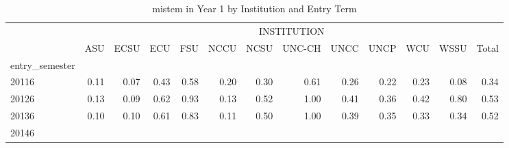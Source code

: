 \begin{table}[!h]
\caption{mistem in Year 1 by Institution and Entry Term}
\centering
\begin{tabular}{lllllllllllll}
\cline{1-13}
\multicolumn{1}{c}{} &
  \multicolumn{12}{|c}{INSTITUTION} \\
\multicolumn{1}{c}{} &
  \multicolumn{1}{|r}{ASU} &
  \multicolumn{1}{r}{ECSU} &
  \multicolumn{1}{r}{ECU} &
  \multicolumn{1}{r}{FSU} &
  \multicolumn{1}{r}{NCCU} &
  \multicolumn{1}{r}{NCSU} &
  \multicolumn{1}{r}{UNC-CH} &
  \multicolumn{1}{r}{UNCC} &
  \multicolumn{1}{r}{UNCP} &
  \multicolumn{1}{r}{WCU} &
  \multicolumn{1}{r}{WSSU} &
  \multicolumn{1}{r}{Total} \\
\cline{1-13}
\multicolumn{1}{l}{entry\_semester} &
  \multicolumn{1}{|r}{} &
  \multicolumn{1}{r}{} &
  \multicolumn{1}{r}{} &
  \multicolumn{1}{r}{} &
  \multicolumn{1}{r}{} &
  \multicolumn{1}{r}{} &
  \multicolumn{1}{r}{} &
  \multicolumn{1}{r}{} &
  \multicolumn{1}{r}{} &
  \multicolumn{1}{r}{} &
  \multicolumn{1}{r}{} &
  \multicolumn{1}{r}{} \\
\multicolumn{1}{l}{\hspace{1em}20116} &
  \multicolumn{1}{|r}{0.11} &
  \multicolumn{1}{r}{0.07} &
  \multicolumn{1}{r}{0.43} &
  \multicolumn{1}{r}{0.58} &
  \multicolumn{1}{r}{0.20} &
  \multicolumn{1}{r}{0.30} &
  \multicolumn{1}{r}{0.61} &
  \multicolumn{1}{r}{0.26} &
  \multicolumn{1}{r}{0.22} &
  \multicolumn{1}{r}{0.23} &
  \multicolumn{1}{r}{0.08} &
  \multicolumn{1}{r}{0.34} \\
\multicolumn{1}{l}{\hspace{1em}20126} &
  \multicolumn{1}{|r}{0.13} &
  \multicolumn{1}{r}{0.09} &
  \multicolumn{1}{r}{0.62} &
  \multicolumn{1}{r}{0.93} &
  \multicolumn{1}{r}{0.13} &
  \multicolumn{1}{r}{0.52} &
  \multicolumn{1}{r}{1.00} &
  \multicolumn{1}{r}{0.41} &
  \multicolumn{1}{r}{0.36} &
  \multicolumn{1}{r}{0.42} &
  \multicolumn{1}{r}{0.80} &
  \multicolumn{1}{r}{0.53} \\
\multicolumn{1}{l}{\hspace{1em}20136} &
  \multicolumn{1}{|r}{0.10} &
  \multicolumn{1}{r}{0.10} &
  \multicolumn{1}{r}{0.61} &
  \multicolumn{1}{r}{0.83} &
  \multicolumn{1}{r}{0.11} &
  \multicolumn{1}{r}{0.50} &
  \multicolumn{1}{r}{1.00} &
  \multicolumn{1}{r}{0.39} &
  \multicolumn{1}{r}{0.35} &
  \multicolumn{1}{r}{0.33} &
  \multicolumn{1}{r}{0.34} &
  \multicolumn{1}{r}{0.52} \\
\multicolumn{1}{l}{\hspace{1em}20146} &

\end{tabular}
\end{table}
